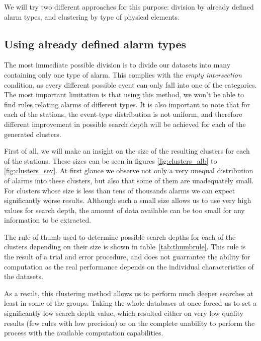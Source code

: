 \documentclass[a4paper,12pt]{article}
\begin{document}
We will try two different approaches for this purpose: division by already defined alarm types, and clustering by type of physical elements.

\subsection{Using already defined alarm types}
\label{sec:using_event_type}
The most immediate possible division is to divide our datasets into many containing only one type of alarm. This complies with the \emph{empty intersection} condition, as every different possible event can only fall into one of the categories. The most important limitation is that using this method, we won't be able to find rules relating alarms of different types. It is also important to note that for each of the stations, the event-type distribution is not uniform, and therefore different improvement in possible search depth will be achieved for each of the generated clusters.

First of all, we will make an insight on the size of the resulting clusters for each of the stations. These sizes can be seen in figures \ref{fig:clusters_alb} to \ref{fig:clusters_sev}. At first glance we observe not only a very unequal distribution of alarms into these clusters, but also that some of them are unadequately small. For clusters whose size is less than tens of thousands alarms we can expect significantly worse results. Although such a small size allows us to use very high values for search depth, the amount of data available can be too small for any information to be extracted.

The rule of thumb used to determine possible search depths for each of the clusters depending on their size is shown in table~\ref{tab:thumbrule}. This rule is the result of a trial and error procedure, and does not guarrantee the ability for computation as the real performance depends on the individual characteristics of the datasets.

As a result, this clustering method allows us to perform much deeper searches at least in some of the groups. Taking the whole databases at once forced us to set a significantly low search depth value, which resulted either on very low quality results (few rules with low precision) or on the complete unability to perform the process with the available computation capabilities.
\end{document}
